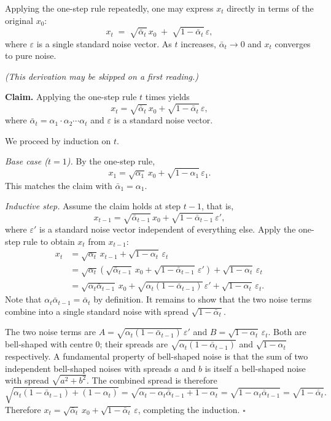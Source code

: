 \documentclass[11pt]{article}
\begin{document}
Applying the one-step rule repeatedly, one may express $x_t$ directly in terms of the original $x_0$:
\[
  x_t \;=\; \sqrt{\bar{\alpha}_t}\,x_0 \;+\; \sqrt{1-\bar{\alpha}_t}\,\varepsilon,
\]
where $\varepsilon$ is a single standard noise vector.
As $t$ increases, $\bar{\alpha}_t \to 0$ and $x_t$ converges to pure noise.

\begin{mdframed}[linewidth=1pt, frametitle={\textbf{Proof (for the curious reader): multi-step forward formula}}]
\textit{(This derivation may be skipped on a first reading.)}

\medskip\noindent
\textbf{Claim.} Applying the one-step rule $t$ times yields
\[
x_t = \sqrt{\bar\alpha_t}\,x_0 + \sqrt{1-\bar\alpha_t}\,\varepsilon,
\]
where $\bar\alpha_t = \alpha_1 \cdot \alpha_2 \cdots \alpha_t$ and $\varepsilon$ is a standard noise vector.

\medskip\noindent
We proceed by induction on $t$.

\medskip\noindent
\emph{Base case ($t=1$).}
By the one-step rule,
\[
x_1 = \sqrt{\alpha_1}\,x_0 + \sqrt{1-\alpha_1}\,\varepsilon_1.
\]
This matches the claim with $\bar\alpha_1 = \alpha_1$.

\medskip\noindent
\emph{Inductive step.}
Assume the claim holds at step $t-1$, that is,
\[
x_{t-1} = \sqrt{\bar\alpha_{t-1}}\,x_0 + \sqrt{1-\bar\alpha_{t-1}}\,\varepsilon',
\]
where $\varepsilon'$ is a standard noise vector independent of everything else.
Apply the one-step rule to obtain $x_t$ from $x_{t-1}$:
\begin{align*}
x_t
&= \sqrt{\alpha_t}\,x_{t-1} + \sqrt{1-\alpha_t}\,\varepsilon_t \\
&= \sqrt{\alpha_t}\!\left(\sqrt{\bar\alpha_{t-1}}\,x_0 + \sqrt{1-\bar\alpha_{t-1}}\,\varepsilon'\right) + \sqrt{1-\alpha_t}\,\varepsilon_t \\
&= \sqrt{\alpha_t\bar\alpha_{t-1}}\,x_0
  + \sqrt{\alpha_t(1-\bar\alpha_{t-1})}\,\varepsilon'
  + \sqrt{1-\alpha_t}\,\varepsilon_t.
\end{align*}
Note that $\alpha_t\bar\alpha_{t-1} = \bar\alpha_t$ by definition.
It remains to show that the two noise terms combine into a single standard noise with spread $\sqrt{1-\bar\alpha_t}$.

The two noise terms are $A = \sqrt{\alpha_t(1-\bar\alpha_{t-1})}\,\varepsilon'$ and $B = \sqrt{1-\alpha_t}\,\varepsilon_t$.
Both are bell-shaped with centre $0$; their spreads are $\sqrt{\alpha_t(1-\bar\alpha_{t-1})}$ and $\sqrt{1-\alpha_t}$ respectively.
A fundamental property of bell-shaped noise is that the sum of two independent bell-shaped noises with spreads $a$ and $b$ is itself a bell-shaped noise with spread $\sqrt{a^2+b^2}$.
The combined spread is therefore
\[
\sqrt{\alpha_t(1-\bar\alpha_{t-1}) + (1-\alpha_t)}
= \sqrt{\alpha_t - \alpha_t\bar\alpha_{t-1} + 1 - \alpha_t}
= \sqrt{1 - \alpha_t\bar\alpha_{t-1}}
= \sqrt{1 - \bar\alpha_t}.
\]
Therefore $x_t = \sqrt{\bar\alpha_t}\,x_0 + \sqrt{1-\bar\alpha_t}\,\varepsilon$, completing the induction. \hfill$\square$
\end{mdframed}
\end{document}
